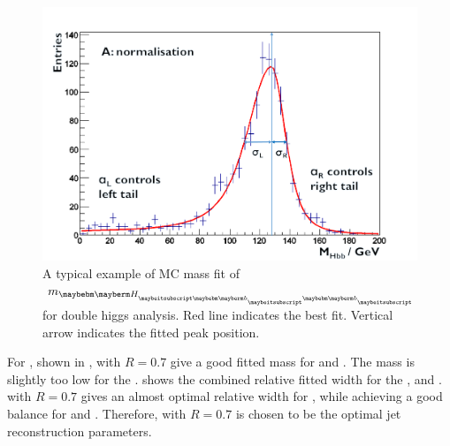 \begin{figure}[!tbp]
\includegraphics[width=\largefigwidth]{doubleHiggs/MCmassFit}
\caption[Example MC mass fit for double higgs analysis]%
   {A typical example of MC mass fit of $m_{\Hbb}$ for double higgs analysis. Red line indicates the best fit. Vertical arrow indicates the fitted peak position.}
   \label{fig:doubleHiggsFitMCMass}
\end{figure}

For , shown in , \normalPFO with $R = 0.7$ give a good fitted mass for \HWW and \PW. The mass is slightly too low for the \Hbb.  shows the combined relative fitted width for the \Hbb, \HWW and \PW. \NormalPFO with $R = 0.7$ gives an almost optimal relative width for \Hbb, while achieving a good balance for \HWW and \PW. Therefore, \normalPFO with $R = 0.7$ is chosen to be the optimal jet reconstruction parameters.

